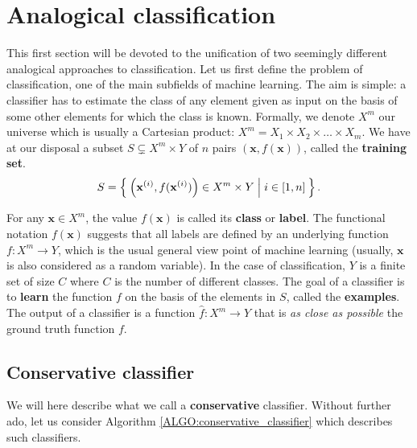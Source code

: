 \section{Analogical classification}
\label{SEC:analogical_classification}

This first section will be devoted to the unification of two seemingly
different analogical approaches to classification.  Let us first define the
problem of classification, one of the main subfields of machine learning. The
aim is simple: a classifier has to estimate the class of any element given as
input on the basis of some other elements for which the class is known.
Formally, we denote $X^m$ our universe which is usually a Cartesian product:
$X^m = X_1 \times X_2 \times \ldots \times X_m$. We have at our disposal a
subset $S \subsetneq X^m \times Y$ of $n$ pairs $\left(\mathbf{x},
f(\mathbf{x})\right)$, called the \textbf{training set}.  $$S=
\Set{\left(\mathbf{x}^{(i)}, f(\mathbf{x}^{(i)})\right) \in X^m \times Y | i
\in [1,n]}.$$

For any $\mathbf{x} \in X^m$, the value $f(\mathbf{x})$ is called its
\textbf{class} or \textbf{label}.
The functional notation $f(\mathbf{x})$ suggests that all labels
are defined by an underlying function $f \colon X^m \to Y$, which is the usual
general view point of machine learning (usually, $\mathbf{x}$ is also
considered as a random variable). In the case of classification, $Y$ is a
finite set of size $C$ where $C$ is the number of different classes. The goal
of a classifier is to \textbf{learn} the function $f$ on the basis of the
elements in $S$, called the \textbf{examples}. The output of a classifier is a
function $\hat{f} \colon X^m \to Y$ that is \textit{as close as possible} the
ground truth function $f$.

\subsection{Conservative classifier}
\label{SEC:conservative_classifier}

We will here describe what we call a \textbf{conservative} classifier. Without
further ado, let us consider Algorithm \ref{ALGO:conservative_classifier} which
describes such classifiers.

